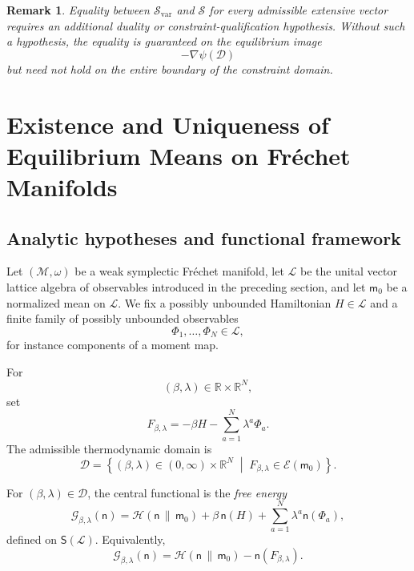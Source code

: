 \documentclass[10pt,a4paper]{amsart}
\newtheorem{rem}[Theorem]{Remark}
\begin{document}
\begin{rem}
Equality between $\mathcal S_{\mathrm{var}}$ and $\mathcal S$ for every
admissible extensive vector requires an additional duality or
constraint-qualification hypothesis. Without such a hypothesis, the
equality is guaranteed on the equilibrium image
\[
-\nabla\psi(\mathcal D)
\]
but need not hold on the entire boundary of the constraint domain.
\end{rem}
\section{Existence and Uniqueness of Equilibrium Means on Fréchet Manifolds}

\subsection{Analytic hypotheses and functional framework}

Let $(\mathcal M,\omega)$ be a weak symplectic Fréchet manifold, let
$\mathcal L$ be the unital vector lattice algebra of observables
introduced in the preceding section, and let $\mathsf m_0$ be a
normalized mean on $\mathcal L$. We fix a possibly unbounded Hamiltonian
$H\in\mathcal L$ and a finite family of possibly unbounded observables
\[
\Phi_1,\ldots,\Phi_N\in\mathcal L,
\]
for instance components of a moment map.

For
\[
(\beta,\lambda)\in\mathbb R\times\mathbb R^N,
\]
set
\[
F_{\beta,\lambda}
=
-\beta H-\sum_{a=1}^{N}\lambda^a\Phi_a.
\]
The admissible thermodynamic domain is
\[
\mathcal D
=
\left\{
(\beta,\lambda)\in(0,\infty)\times\mathbb R^N
\;\middle|\;
F_{\beta,\lambda}\in\mathcal E(\mathsf m_0)
\right\}.
\]

For $(\beta,\lambda)\in\mathcal D$, the central functional is the
\emph{free energy}
\[
\mathcal G_{\beta,\lambda}(\mathsf n)
=
\mathcal H(\mathsf n\,\|\,\mathsf m_0)
+
\beta\,\mathsf n(H)
+
\sum_{a=1}^{N}\lambda^a\mathsf n(\Phi_a),
\]
defined on $\mathsf S(\mathcal L)$. Equivalently,
\[
\mathcal G_{\beta,\lambda}(\mathsf n)
=
\mathcal H(\mathsf n\,\|\,\mathsf m_0)
-
\mathsf n(F_{\beta,\lambda}).
\]
\end{document}
